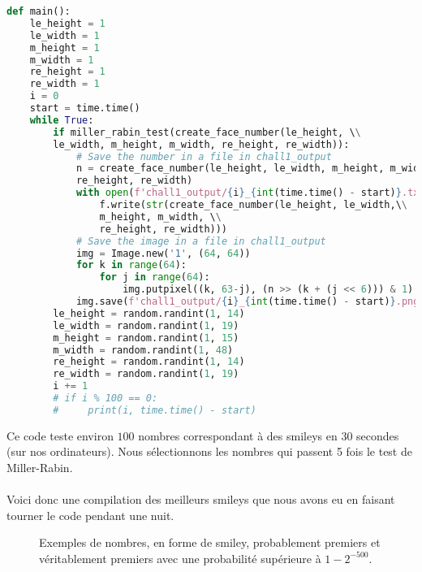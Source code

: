 \documentclass{article}
\begin{document}
\begin{lstlisting}[language = Python]
def main():
    le_height = 1
    le_width = 1
    m_height = 1
    m_width = 1
    re_height = 1
    re_width = 1
    i = 0
    start = time.time()
    while True:
        if miller_rabin_test(create_face_number(le_height, \\
        le_width, m_height, m_width, re_height, re_width)):
            # Save the number in a file in chall1_output
            n = create_face_number(le_height, le_width, m_height, m_width,\\
            re_height, re_width)
            with open(f'chall1_output/{i}_{int(time.time() - start)}.txt', 'w') as f:
                f.write(str(create_face_number(le_height, le_width,\\
                m_height, m_width, \\
                re_height, re_width)))
            # Save the image in a file in chall1_output
            img = Image.new('1', (64, 64)) 
            for k in range(64):
                for j in range(64):
                    img.putpixel((k, 63-j), (n >> (k + (j << 6))) & 1)
            img.save(f'chall1_output/{i}_{int(time.time() - start)}.png')
        le_height = random.randint(1, 14)
        le_width = random.randint(1, 19)
        m_height = random.randint(1, 15)
        m_width = random.randint(1, 48)
        re_height = random.randint(1, 14)
        re_width = random.randint(1, 19)
        i += 1
        # if i % 100 == 0:
        #     print(i, time.time() - start)
\end{lstlisting}

Ce code teste environ $100$ nombres correspondant à des smileys en $30$ secondes (sur nos ordinateurs). Nous sélectionnons les nombres qui passent 5 fois le test de Miller-Rabin.\\ \\
Voici donc une compilation des meilleurs smileys que nous avons eu en faisant tourner le code pendant une nuit.

\begin{figure}[H]
    \centering
    \caption{Exemples de nombres, en forme de smiley, probablement premiers et véritablement premiers avec une probabilité supérieure à $1 - 2^{-500}$.}
    \label{fig:images}
\end{figure}
\end{document}
